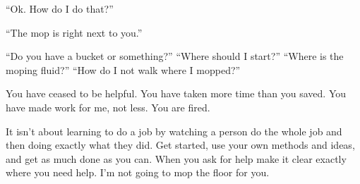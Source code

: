 \documentclass[12pt]{article}
\begin{document}
``Ok. How do I do that?''

``The mop is right next to you.''

``Do you have a bucket or something?''
``Where should I start?'' ``Where is the moping fluid?'' ``How do I not walk where I mopped?''

You have ceased to be helpful. You have taken more time than you saved. You have made work for me, not less. You are fired. 

It isn't about learning to do a job by watching a person do the whole job and then doing exactly what they did. Get started, use your own methods and ideas, and get as much done as you can. When you ask for help make it clear exactly where you need help. I'm not going to mop the floor for you. 









%
%
%
\end{document}
